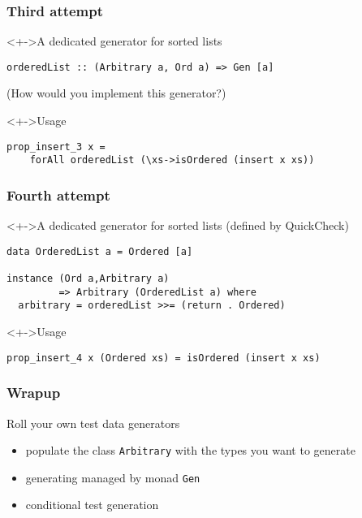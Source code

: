 \documentclass{beamer}
\begin{document}
\begin{frame}[fragile]
  \frametitle{Third attempt}
  \begin{block}<+->{A dedicated generator for sorted lists}
\begin{verbatim}
orderedList :: (Arbitrary a, Ord a) => Gen [a]
\end{verbatim}
    (How would you implement this generator?)
  \end{block}
  \begin{block}<+->{Usage}
\begin{verbatim}
prop_insert_3 x =
    forAll orderedList (\xs->isOrdered (insert x xs))
\end{verbatim}
  \end{block}
\end{frame}
\begin{frame}[fragile]
  \frametitle{Fourth attempt}
  \begin{block}<+->{A dedicated generator for sorted lists (defined by QuickCheck)}
\begin{verbatim}
data OrderedList a = Ordered [a]

instance (Ord a,Arbitrary a)
         => Arbitrary (OrderedList a) where
  arbitrary = orderedList >>= (return . Ordered)
\end{verbatim}
  \end{block}
  \begin{block}<+->{Usage}
\begin{verbatim}
prop_insert_4 x (Ordered xs) = isOrdered (insert x xs)
\end{verbatim}
  \end{block}
\end{frame}
\begin{frame}
  \frametitle{Wrapup}
  \begin{alertblock}{Roll your own test data generators}
  \begin{itemize}
  \item populate the class \texttt{Arbitrary} with the types you want to generate
  \item generating managed by monad \texttt{Gen}
  \item conditional test generation
  \end{itemize}
  \end{alertblock}
\end{frame}

\end{document}
